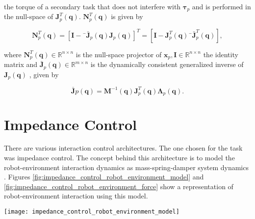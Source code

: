 the torque of a secondary task that does not interfere with $\boldsymbol{\tau}_p$ and is performed in the null-space of $\boldsymbol{J}^T_p (\boldsymbol{q})$. $\boldsymbol{N}^T_p(\boldsymbol{q})$ is given by 

\begin{equation}
    \boldsymbol{N}^T_p(\boldsymbol{q}) = [\boldsymbol{I} - ¯\boldsymbol{\bar{J}}_p(\boldsymbol{q}) \boldsymbol{J}_p(\boldsymbol{q})]^T = [\boldsymbol{I} - \boldsymbol{J}^T_p(\boldsymbol{q}) ¯\boldsymbol{\bar{J}}^T_p(\boldsymbol{q})],
\end{equation}

where $\boldsymbol{N}^T_p(\boldsymbol{q}) \in \mathbb{R}^{n\times n}$ is the null-space projector of $\boldsymbol{x}_p, \boldsymbol{I} \in \mathbb{R}^{n\times n}$ the identity matrix and $\boldsymbol{\bar{J}}_p(\boldsymbol{q}) \in \mathbb{R}^{m\times n}$ is the dynamically
consistent generalized inverse of $\boldsymbol{J}_p(\boldsymbol{q})$ \cite{Santos2018_computed_torque_control_robotic_assisted_tele_ecography}, given by 

\begin{equation}
    \boldsymbol{\bar{J}}p(\boldsymbol{q}) = \boldsymbol{M}^{-1}(\boldsymbol{q}) \boldsymbol{J}^T_p(\boldsymbol{q}) \boldsymbol{\Lambda}_p(\boldsymbol{q}).
\end{equation}


\section{Impedance Control}
\label{sec:control_architectures_impedance_control}

There are various interaction control architectures. The one chosen for the task was impedance control. The concept behind this architecture is to model the robot-environment interaction dynamics as mass-spring-damper system dynamics \cite{Ott2008_cartesian_impedance_control}. Figures \ref{fig:impedance_control_robot_environment_model} and \ref{fig:impedance_control_robot_environment_force} show a representation of robot-environment interaction using this model.

\begin{figure*}[htbp]
	\begin{minipage}[b]{.48\textwidth}
	\centering
	\texttt{[image: impedance\_control\_robot\_environment\_model]}
	\caption{System model of robot and rigid environment: (a) without any contact between robot and environment, (b) critical point when contact occurs but $f = 0$ and (c) contact with $f \neq 0$. \cite{Duan2018_adaptive_variable_impedance_control}}
	\label{fig:impedance_control_robot_environment_model}
	\end{minipage}%
	\hfill
	\begin{minipage}[b]{.48\textwidth}
	\centering
	\caption{The diagram of robot and environment contact force. \cite{Duan2018_adaptive_variable_impedance_control}}
	\label{fig:impedance_control_robot_environment_force}
	\end{minipage}
\end{figure*}

